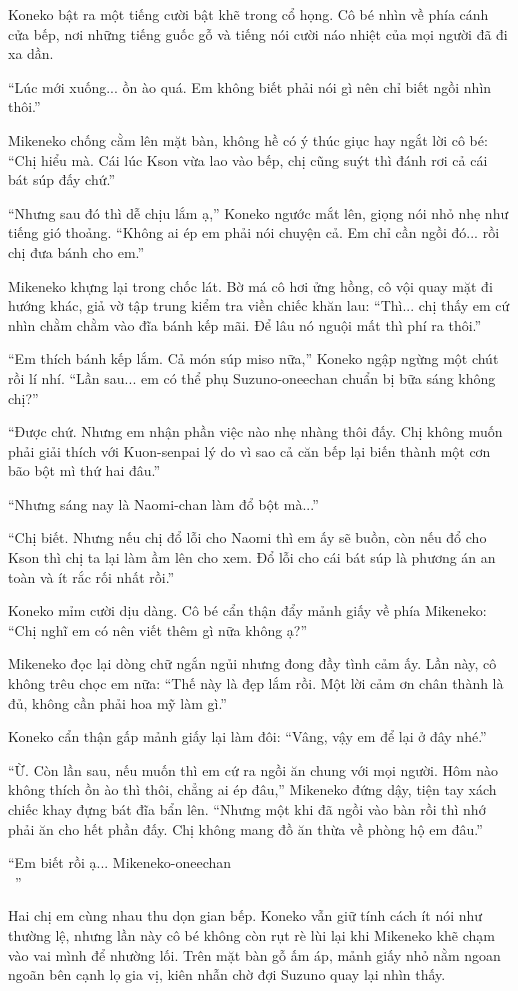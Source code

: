 ﻿\documentclass[../main.tex]{subfiles}
\begin{document}
Koneko bật ra một tiếng cười bật khẽ trong cổ họng. Cô bé nhìn về phía cánh cửa bếp, nơi những tiếng guốc gỗ và tiếng nói cười náo nhiệt của mọi người đã đi xa dần.

``Lúc mới xuống... ồn ào quá. Em không biết phải nói gì nên chỉ biết ngồi nhìn thôi.''

Mikeneko chống cằm lên mặt bàn, không hề có ý thúc giục hay ngắt lời cô bé: ``Chị hiểu mà. Cái lúc Kson vừa lao vào bếp, chị cũng suýt thì đánh rơi cả cái bát súp đấy chứ.''

``Nhưng sau đó thì dễ chịu lắm ạ,'' Koneko ngước mắt lên, giọng nói nhỏ nhẹ như tiếng gió thoảng. ``Không ai ép em phải nói chuyện cả. Em chỉ cần ngồi đó... rồi chị đưa bánh cho em.''

Mikeneko khựng lại trong chốc lát. Bờ má cô hơi ửng hồng, cô vội quay mặt đi hướng khác, giả vờ tập trung kiểm tra viền chiếc khăn lau: ``Thì... chị thấy em cứ nhìn chằm chằm vào đĩa bánh kếp mãi. Để lâu nó nguội mất thì phí ra thôi.''

``Em thích bánh kếp lắm. Cả món súp miso nữa,'' Koneko ngập ngừng một chút rồi lí nhí. ``Lần sau... em có thể phụ Suzuno-oneechan chuẩn bị bữa sáng không chị?''

``Được chứ. Nhưng em nhận phần việc nào nhẹ nhàng thôi đấy. Chị không muốn phải giải thích với Kuon-senpai lý do vì sao cả căn bếp lại biến thành một cơn bão bột mì thứ hai đâu.''

``Nhưng sáng nay là Naomi-chan làm đổ bột mà...''

``Chị biết. Nhưng nếu chị đổ lỗi cho Naomi thì em ấy sẽ buồn, còn nếu đổ cho Kson thì chị ta lại làm ầm lên cho xem. Đổ lỗi cho cái bát súp là phương án an toàn và ít rắc rối nhất rồi.''

Koneko mỉm cười dịu dàng. Cô bé cẩn thận đẩy mảnh giấy về phía Mikeneko: ``Chị nghĩ em có nên viết thêm gì nữa không ạ?''

Mikeneko đọc lại dòng chữ ngắn ngủi nhưng đong đầy tình cảm ấy. Lần này, cô không trêu chọc em nữa: ``Thế này là đẹp lắm rồi. Một lời cảm ơn chân thành là đủ, không cần phải hoa mỹ làm gì.''

Koneko cẩn thận gấp mảnh giấy lại làm đôi: ``Vâng, vậy em để lại ở đây nhé.''

``Ừ. Còn lần sau, nếu muốn thì em cứ ra ngồi ăn chung với mọi người. Hôm nào không thích ồn ào thì thôi, chẳng ai ép đâu,'' Mikeneko đứng dậy, tiện tay xách chiếc khay đựng bát đĩa bẩn lên. ``Nhưng một khi đã ngồi vào bàn rồi thì nhớ phải ăn cho hết phần đấy. Chị không mang đồ ăn thừa về phòng hộ em đâu.''

``Em biết rồi ạ... Mikeneko-oneechan\\~{}{}''

Hai chị em cùng nhau thu dọn gian bếp. Koneko vẫn giữ tính cách ít nói như thường lệ, nhưng lần này cô bé không còn rụt rè lùi lại khi Mikeneko khẽ chạm vào vai mình để nhường lối. Trên mặt bàn gỗ ấm áp, mảnh giấy nhỏ nằm ngoan ngoãn bên cạnh lọ gia vị, kiên nhẫn chờ đợi Suzuno quay lại nhìn thấy.
\end{document}
